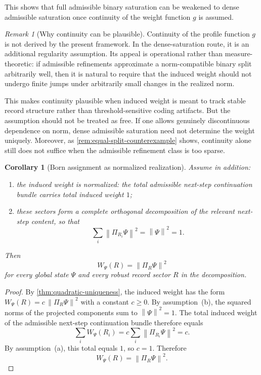 \documentclass[11pt]{article}
\newtheorem{corollary}{Corollary}
\theoremstyle{remark}
\newtheorem{remark}{Remark}
\numberwithin{equation}{section}
\newcommand{\Wpsi}[1]{W_{\Psi}\!\left(#1\right)}
\newcommand{\Proj}[1]{\Pi_{#1}}
\newcommand{\norm}[1]{\left\lVert #1 \right\rVert}
\begin{document}
This shows that full admissible binary saturation can be weakened to dense admissible saturation once continuity of the weight function $g$ is assumed.

\begin{remark}[Why continuity can be plausible]
Continuity of the profile function $g$ is not derived by the present
framework. In the dense-saturation route, it is an additional
regularity assumption. Its appeal is operational rather than
measure-theoretic: if admissible refinements approximate a
norm-compatible binary split arbitrarily well, then it is natural to
require that the induced weight should not undergo finite jumps under
arbitrarily small changes in the realized norm.

This makes continuity plausible when induced weight is meant to track
stable record structure rather than threshold-sensitive coding
artifacts. But the assumption should not be treated as free. If one
allows genuinely discontinuous dependence on norm, dense admissible
saturation need not determine the weight uniquely. Moreover, as
\cref{rem:equal-split-counterexample} shows, continuity alone still
does not suffice when the admissible refinement class is too sparse.
\end{remark}

\begin{corollary}[Born assignment as normalized realization]
\label{cor:normalized-quadratic-weight}
Assume in addition:
\begin{enumerate}[label=(\alph*)]
\item the induced weight is normalized: the total admissible next-step
  continuation bundle carries total induced weight $1$;
\item these sectors form a complete orthogonal decomposition of the
  relevant next-step content, so that
  \[
    \sum_i \norm{\Proj{R_i}\Psi}^2 = \norm{\Psi}^2 = 1.
  \]
\end{enumerate}
Then
\[
  \Wpsi{R} = \norm{\Proj{R}\Psi}^2
\]
for every global state $\Psi$ and every robust record sector $R$ in
the decomposition.
\end{corollary}

\begin{proof}
By \cref{thm:quadratic-uniqueness}, the induced weight has the form
$\Wpsi{R} = c\,\norm{\Proj{R}\Psi}^2$ with a constant $c \geq 0$.
By assumption~(b), the squared norms of the projected components sum
to $\norm{\Psi}^2 = 1$. The total induced weight of the admissible
next-step continuation bundle therefore equals
\[
  \sum_i \Wpsi{R_i} = c \sum_i \norm{\Proj{R_i}\Psi}^2 = c.
\]
By assumption~(a), this total equals $1$, so $c = 1$. Therefore
\[
  \Wpsi{R} = \norm{\Proj{R}\Psi}^2.
\]
\end{proof}
\end{document}
